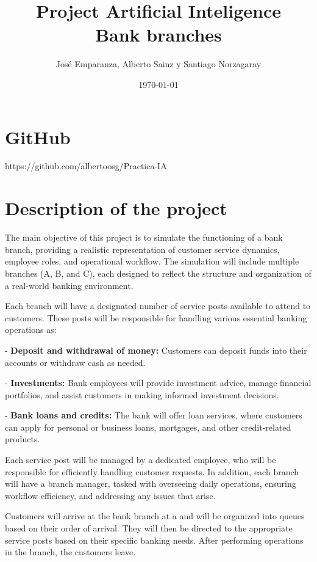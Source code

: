 \documentclass[titlepage, 12pt]{article}
\title{\textbf{Project Artificial Inteligence \\ Bank branches}}
\author{José Emparanza, Alberto Sainz y Santiago Norzagaray}
\date{\today}
\begin{document}
\maketitle

\tableofcontents

\newpage

\section{GitHub}
https://github.com/albertoosg/Practica-IA

\section{Description of the project}
The main objective of this project is to simulate the functioning of a bank branch, providing a realistic representation of customer service dynamics, employee roles, and operational workflow. The simulation will include multiple branches (A, B, and C), each designed to reflect the structure and organization of a real-world banking environment.

Each branch will have a designated number of service posts available to attend to customers. These posts will be responsible for handling various essential banking operations as:

- \textbf{Deposit and withdrawal of money:} Customers can deposit funds into their accounts or withdraw cash as needed.

- \textbf{Investments:} Bank employees will provide investment advice, manage financial portfolios, and assist customers in making informed investment decisions.

- \textbf{Bank loans and credits:} The bank will offer loan services, where customers can apply for personal or business loans, mortgages, and other credit-related products.

Each service post will be managed by a dedicated employee, who will be responsible for efficiently handling customer requests. In addition, each branch will have a branch manager, tasked with overseeing daily operations, ensuring workflow efficiency, and addressing any issues that arise. 

Customers will arrive at the bank branch at a and will be organized into queues based on their order of arrival. They will then be directed to the appropriate service posts based on their specific banking needs. After performing operations in the branch, the customers leave. 
\end{document}
